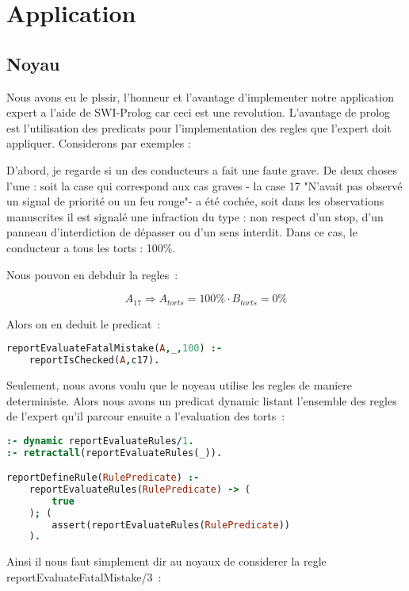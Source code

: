 \chapter{Application}

\section{Noyau}

Nous avons eu le plssir, l'honneur et l'avantage d'implementer notre application expert a l'aide de SWI-Prolog car ceci est une revolution.
L'avantage de prolog est l'utilisation des predicats pour l'implementation des regles que l'expert doit appliquer. Considerons par exemples :

D'abord, je regarde si un des conducteurs a fait une faute grave. De deux choses l'une : soit la case qui correspond aux cas graves - la case
17 "N'avait pas observé un signal de priorité ou un feu rouge"- a été cochée, soit dans les observations manuscrites il est signalé une
infraction du type : non respect d'un stop, d'un panneau d'interdiction de dépasser ou d'un sens interdit. Dans ce cas, le conducteur a tous
les torts : 100\%.

Nous pouvon en debduir la regles~:

\[A_{17} \Rightarrow A_{torts} = 100\% \cdot B_{torts} = 0\%\]

Alors on en deduit le predicat~:

\begin{lstlisting}[language=Prolog,frame=single]
reportEvaluateFatalMistake(A,_,100) :-
    reportIsChecked(A,c17).
\end{lstlisting}

Seulement, nous avons voulu que le noyeau utilise les regles de maniere deterministe. Alors nous avons un predicat dynamic listant l'ensemble
des regles de l'expert qu'il parcour ensuite a l'evaluation des torts~:

\begin{lstlisting}[language=Prolog,frame=single]
:- dynamic reportEvaluateRules/1.
:- retractall(reportEvaluateRules(_)).

reportDefineRule(RulePredicate) :-
    reportEvaluateRules(RulePredicate) -> (
        true
    ); (
        assert(reportEvaluateRules(RulePredicate))
    ).
\end{lstlisting}

Ainsi il nous faut simplement dir au noyaux de considerer la regle reportEvaluateFatalMistake/3~:

